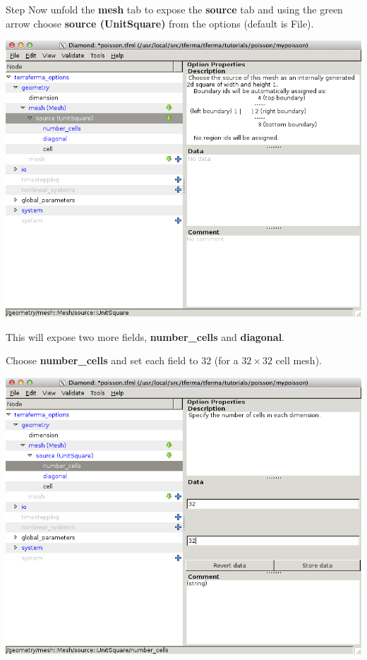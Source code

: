 \begin{steps}{Step}
Now unfold the \textbf{mesh} tab to expose the \textbf{source} tab and
using the green arrow choose \textbf{source (UnitSquare)} from the
options (default is File).
\begin{center}
  \includegraphics[width=\diamondwidth]{figures/screendumps/diamond_poisson_03b.png}
\end{center}
This will expose two more fields, \textbf{number\_cells} and
\textbf{diagonal}.

Choose \textbf{number\_cells} and set each field to 32 (for a
$32\times32$ cell mesh).
\begin{center}
    \includegraphics[width=\diamondwidth]{figures/screendumps/diamond_poisson_03c.png}
\end{center}


\end{steps}
